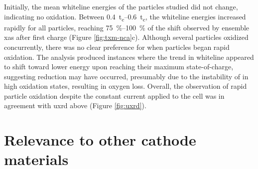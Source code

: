 \documentclass{article}
\begin{document}
Initially, the mean whiteline energies of the particles studied did
not change, indicating no  oxidation. Between
\SIrange{0.4}{0.6}{t_c}, the whiteline energies increased rapidly for
all particles, reaching \SIrange{75}{100}{\percent} of the shift
observed by ensemble \gls{xas} after first charge (Figure
\ref{fig:txm-nca}c). Although several particles oxidized concurrently,
there was no clear preference for when particles began rapid
oxidation. The analysis produced instances where the trend in
whiteline appeared to shift toward lower energy upon reaching their
maximum state-of-charge, suggesting  reduction may have
occurred, presumably due to the instability of  in high
oxidation states\cite{myung2020-2}, resulting in oxygen loss. Overall,
the observation of rapid particle oxidation despite the constant
current applied to the cell was in agreement with \gls{uxrd} above
(Figure \ref{fig:uxrd}).


\newpage %
\section{Relevance to other cathode materials}

\end{document}
